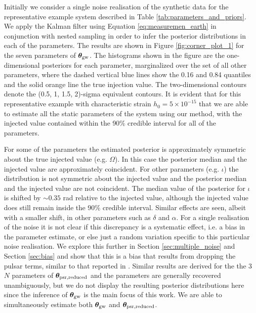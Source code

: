 \documentclass[fleqn,usenatbib,useAMS]{mnras}
\begin{document}
	Initially we consider a single noise realisation of the synthetic data for the representative example system described in Table \ref{tab:parameters_and_priors}. We apply the Kalman filter using Equation \eqref{eq:measuremen_earth} in conjunction with nested sampling in order to infer the posterior distributions in each of the parameters. The results are shown in Figure \ref{fig:corner_plot_1} for the seven parameters of  $\boldsymbol{\theta}_{\rm gw}$. The histograms shown in the figure are the one-dimensional posteriors for each parameter, marginalized over the set of all other parameters, where the dashed vertical blue lines show the 0.16 and 0.84 quantiles and the solid orange line the true injection value. The two-dimensional contours denote the (0.5, 1, 1.5, 2)-sigma equivalent contours. It is evident that for this representative example with characteristic strain $h_0 = 5 \times 10^{-15}$ that we are able to estimate all the static parameters of the system using our method, with the injected value contained within the 90\% credible interval for all of the parameters. \newline 
 
 
 For some of the parameters the estimated posterior is approximately symmetric about the true injected value (e.g. $\Omega$). In this case the posterior median and the injected value are approximately coincident. For other parameters (e.g. $\iota$) the distribution is not symmetric about the injected value and the posterior median and the injected value are not coincident. The median value of the posterior for $\iota$ is shifted by $\sim 0.35$ rad relative to the injected value, although the injected value does still remain inside the 90\% credible interval. Similar effects are seen, albeit with a smaller shift, in other parameters such as $\delta$ and $\alpha$. For a single realisation of the noise it is not clear if this discrepancy is a systematic effect, i.e. a bias in the parameter estimate, or else just a random variation specific to this particular noise realisation. We explore this further in Section \ref{sec:multiple_noise} and Section \ref{sec:bias} and show that this is a bias that results from dropping the pulsar terms, similar to that reported in \cite{Zhupulsarterms}. Similar results are derived for the the 3$N$ parameters of $\boldsymbol{\theta}_{\rm psr, reduced}$ and the parameters are generally recovered unambiguously, but we do not display the resulting posterior distributions here since the inference of $\boldsymbol{\theta}_{\rm gw}$ is the main focus of this work. We are able to simultaneously estimate both $\boldsymbol{\theta}_{\rm gw}$ and $\boldsymbol{\theta}_{\rm psr, reduced}$. 
 
\end{document}
